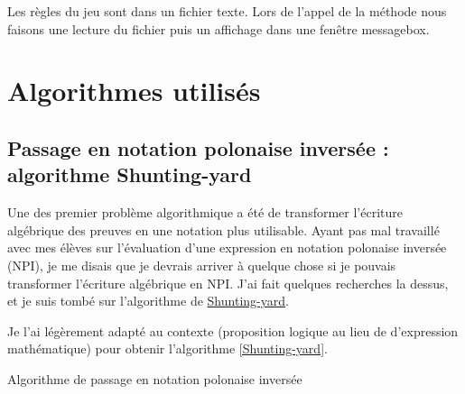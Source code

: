 \documentclass[12pt, algo]{cours}
\begin{document}
Les règles du jeu sont dans un fichier texte. Lors de l'appel de la méthode nous faisons une lecture du fichier puis un affichage dans une fenêtre messagebox.


\section{Algorithmes utilisés}

\subsection{Passage en notation polonaise inversée : algorithme Shunting-yard}

Une des premier problème algorithmique a été de transformer l'écriture algébrique des preuves en une notation plus utilisable. Ayant pas mal travaillé avec mes élèves sur l'évaluation d'une expression en notation polonaise inversée (NPI), je me disais que je devrais arriver à quelque chose si je pouvais transformer l'écriture algébrique en NPI. J'ai fait quelques recherches la dessus, et je suis tombé sur l'algorithme de \href{https://fr.wikipedia.org/wiki/Algorithme_Shunting-yard}{Shunting-yard}.

Je l'ai légèrement adapté au contexte (proposition logique au lieu de d'expression mathématique) pour obtenir l'algorithme \ref{Shunting-yard}.


\begin{algorithm}
\caption{Algorithme de passage en notation polonaise inversée}
\label{Shunting-yard}
\end{algorithm}
\end{document}
